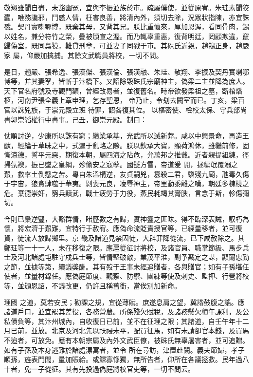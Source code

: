 \begin{pinyinscope}
 敬翔雖聞自盡，未豁幽冤，宜與李振並族於市。疏屬僕使，並從原宥。朱珪素聞狡蠹，唯務讒邪，鬥惑人情，枉害良善，將清內外，須切去除，況眾狀指陳，亦宜誅戮。契丹實喇鄂博，既棄其母，又背其兄。朕比重懷來，厚加恩渥，看同骨肉，錫以姓名，兼分符竹之榮，疊被頒宣之渥。而乃輒辜重惠，復背明廷，罔顧欺違，竄歸偽室，既同梟獍，難貸刑章，可並妻子同戮于市。其硃氏近親，趙鵠正身，趙嚴家
 屬，仰嚴加擒捕。其餘文武職員將校，一切不問。


是日，趙嚴、張希逸、張漢傑、張漢倫、張漢融、朱珪、敬翔、李振及契丹實喇鄂博等，并其妻孥，皆斬于汴橋下。又詔除毀硃氏宗廟神主，偽梁二主並降為庶人。天下官名府號及寺觀門額，曾經改易者，並復舊名。時帝欲發梁祖之墓，斲棺燔柩，河南尹張全義上章申理，乞存聖恩，
 帝乃止，令刬去闕室而已。丁亥，梁百官以誅兇族，于崇元殿立班
 待罪，詔各復其位。
 以樞密使、檢校太保、守兵部尚書郭崇韜權行中書事。己丑，御崇元殿。制曰：



 仗順討逆，少康所以誅有窮；纘業承基，光武所以滅新莽。咸以中興景命，再造王猷，經綸于草昧之中，式遏于亂略之際。朕以欽承大寶，顯荷鴻休，雖繼前修，固慚涼德，誓平元惡，期復本朝，屬四海之阽危，允萬邦之推戴。近者親提組練，徑掃氛襖，振已墜之皇綱，殄偷安之寇孽。國讎方雪，帝道爰
 開，拯編氓覆溺之艱，救率土倒懸之苦。粵自朱溫構逆，友貞嗣兇，篡殺二君，隳殘九廟，虺毒久傷于宇宙，狼貪肆噬于華夷。剝喪元良，凌辱神主，帝里動黍離之嘆，朝廷多棟橈之危。棄德崇奸，窮兵黷武，戰士疲勞于力役，蒸民耗竭其膏腴，言念于斯，軫傷彌切。



 今則已梟逆豎，大豁群情，睹歷數之有歸，實神靈之匪昧。得不臨深表誡，馭朽為懷，將宏濟于艱難，宜特行于赦宥。應偽命流貶責授官等，已經量移者，並可復資，徒流人放歸鄉里。京
 畿及諸道見禁囚徒，大辟罪降從流，已下咸赦除之。其鄭玨等一十一人，未在移復之限。應扈從征討將校，及諸官員、職掌節級、馬步兵士及河北諸處屯駐守戍兵士等，皆情堅破敵，業茂平淮，副予戡定之謀，顯爾忠勤之節，並據等第，續議獎酬。其有歿于王事未經追贈者，各與贈官；如有子孫堪任使者，並量材錄任。應偽庭節度、觀察、防禦、團練等使及刺史、監押、行營將校等，並頒恩詔，不議改更，仍許且稱舊銜，當俟別加新命。



 理國
 之道，莫若安民；勸課之規，宜從薄賦。庶遂息肩之望，冀諧鼓腹之謠。應諸道戶口，並宜罷其差役，各務營農。所係殘欠賦稅，及諸務懸欠積年課利，及公私債負等，其汴州城內，自收復日已前，並不在征理之限；其諸道，自壬午年十二月已前，並放。北京及河北先以祆祲未平，配買征馬，如有未請卻官本錢，及買馬不迨者，可放免。應有本朝宗屬及內外文武臣僚，被硃氏無辜屠害者，並可追贈。如有子孫及本身逃難於諸處漂寓者，並令
 所在尋訪，津置赴闕。義夫節婦，孝子順孫，旌表門閭，量加賑給。或鰥寡惸獨，無所告者，仰所在各議拯救。民年過八十者，免一子從征。其有先投過偽庭將校官吏等，一切不問云。




\end{pinyinscope}
